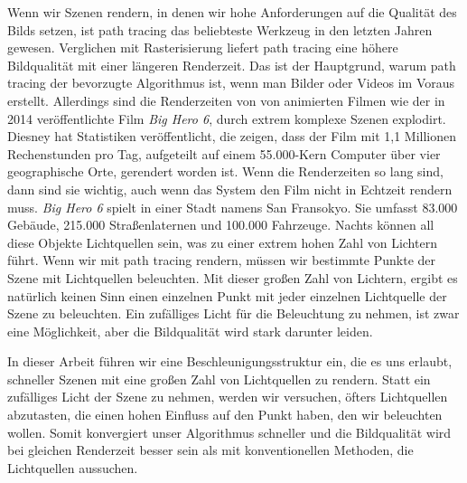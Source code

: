 
\Abstract

Wenn wir Szenen rendern, in denen wir hohe Anforderungen auf die Qualität des Bilds setzen, ist path tracing das beliebteste Werkzeug in den letzten Jahren gewesen. Verglichen mit Rasterisierung liefert path tracing eine höhere Bildqualität mit einer längeren Renderzeit. Das ist der Hauptgrund, warum path tracing der bevorzugte Algorithmus ist, wenn man Bilder oder Videos im Voraus erstellt. Allerdings sind die Renderzeiten von von animierten Filmen wie der in 2014 veröffentlichte Film \textit{Big Hero 6}, durch extrem komplexe Szenen explodirt. Diesney hat Statistiken veröffentlicht, die zeigen, dass der Film mit 1,1 Millionen Rechenstunden pro Tag, aufgeteilt auf einem 55.000-Kern Computer über vier geographische Orte, gerendert worden ist. Wenn die Renderzeiten so lang sind, dann sind sie wichtig, auch wenn das System den Film nicht in Echtzeit rendern muss. \textit{Big Hero 6} spielt in einer Stadt namens San Fransokyo. Sie umfasst 83.000 Gebäude, 215.000 Straßenlaternen und 100.000 Fahrzeuge. Nachts können all diese Objekte Lichtquellen sein, was zu einer extrem hohen Zahl von Lichtern führt. Wenn wir mit path tracing rendern, müssen wir bestimmte Punkte der Szene mit Lichtquellen beleuchten.  Mit dieser großen Zahl von Lichtern, ergibt es natürlich keinen Sinn einen einzelnen Punkt mit jeder einzelnen Lichtquelle der Szene zu beleuchten. Ein zufälliges Licht für die Beleuchtung zu nehmen, ist zwar eine Möglichkeit, aber die Bildqualität wird stark darunter leiden.

In dieser Arbeit führen wir eine Beschleunigungsstruktur ein, die es uns erlaubt, schneller Szenen mit eine großen Zahl von Lichtquellen zu rendern. Statt ein zufälliges Licht der Szene zu nehmen, werden wir versuchen, öfters Lichtquellen abzutasten, die einen hohen Einfluss auf den Punkt haben, den wir beleuchten wollen. Somit konvergiert unser Algorithmus schneller und die Bildqualität wird bei gleichen Renderzeit besser sein als mit konventionellen Methoden, die Lichtquellen aussuchen.